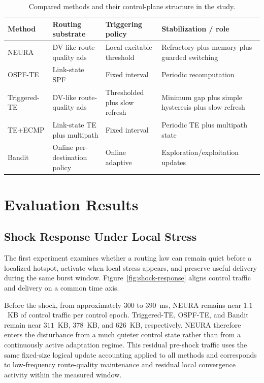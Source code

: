 \documentclass[5p,times]{elsarticle}
\begin{document}
\begin{table}[t]
\centering
\small
\caption{Compared methods and their control-plane structure in the study.}
\label{tab:methods}
\setlength{\tabcolsep}{4pt}
\begin{tabularx}{\textwidth}{@{}l p{3.0cm} p{3.2cm} X@{}}
\toprule
Method & Routing substrate & Triggering policy & Stabilization / role \\
\midrule
NEURA & DV-like route-quality ads & Local excitable threshold & Refractory plus memory plus guarded switching \\
OSPF-TE & Link-state SPF & Fixed interval & Periodic recomputation \\
Triggered-TE & DV-like route-quality ads & Thresholded plus slow refresh & Minimum gap plus simple hysteresis plus slow refresh \\
TE+ECMP & Link-state TE plus multipath & Fixed interval & Periodic TE plus multipath state \\
Bandit & Online per-destination policy & Online adaptive & Exploration/exploitation updates \\
\bottomrule
\end{tabularx}
\end{table}


\section{Evaluation Results}

\subsection{Shock Response Under Local Stress}

The first experiment examines whether a routing law can remain quiet before a localized hotspot, activate when local stress appears, and preserve useful delivery during the same burst window. Figure~\ref{fig:shock-response} aligns control traffic and delivery on a common time axis.

Before the shock, from approximately $300$ to $390$~ms, NEURA remains near $1.1$~KB of control traffic per control epoch. Triggered-TE, OSPF-TE, and Bandit remain near $311$~KB, $378$~KB, and $626$~KB, respectively. NEURA therefore enters the disturbance from a much quieter control state rather than from a continuously active adaptation regime.
This residual pre-shock traffic uses the same fixed-size logical update accounting applied to all methods and corresponds to low-frequency route-quality maintenance and residual local convergence activity within the measured window.
\end{document}
